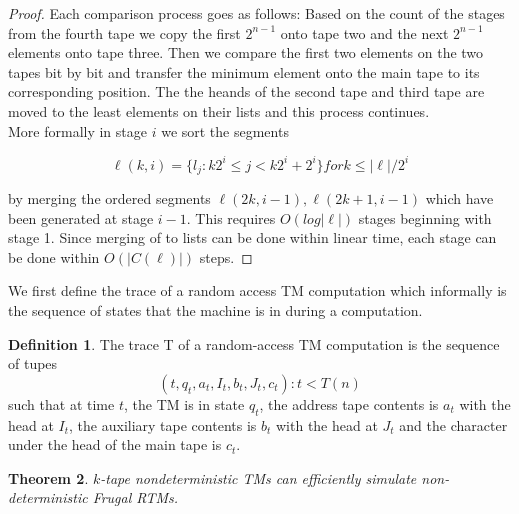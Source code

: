 \documentclass[english]{article}
\theoremstyle{plain}
\newtheorem{thm}{Theorem}
\theoremstyle{definition}
\newtheorem{defn}[thm]{Definition}
\theoremstyle{plain}
\begin{document}
\begin{proof}
  Each comparison process goes as follows: Based on the count of the
  stages from the fourth tape we copy the first $2^{n-1}$ onto tape
  two and the next $2^{n-1}$ elements onto tape three. Then we compare
  the first two elements on the two tapes bit by bit and transfer the
  minimum element onto the main tape to its corresponding
  position. The the heands of the second tape and third tape are moved
  to the least elements on their lists and this process continues.\\

  More formally in stage $i$ we sort the segments

\[
\ell(k,i) = \{l_j: k2^i \leq j < k2^i + 2^i\} for k \leq |\ell|/2^i
\]

  by merging the ordered segments $\ell(2k,i - 1),\ell(2k + 1,i - 1)$
  which have been generated at stage $i - 1$. This requires $O(log
  |\ell|)$ stages beginning with stage 1. Since merging of to lists
  can be done within linear time, each stage can be done within
  $O(|C(\ell)|)$ steps.
\end{proof}

We first define the trace of a random access TM computation which
informally is the sequence of states that the machine is in during a
computation.

\begin{defn}
  The trace T of a random-access TM computation is the sequence of tupes
\[
(t,q_t,a_t,I_t,b_t,J_t,c_t): t < T(n)
\]
  such that at time $t$, the TM is in state $q_t$, the address tape
  contents is $a_t$ with the head at $I_t$, the auxiliary tape
  contents is $b_t$ with the head at $J_t$ and the character under the
  head of the main tape is $c_t$.
\end{defn}

\begin{thm}
  $k$-tape nondeterministic TMs can efficiently simulate
  non-deterministic Frugal RTMs.
\end{thm}
\end{document}
